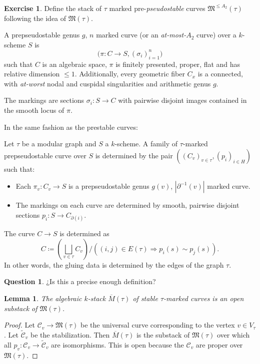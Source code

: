 \documentclass[11pt]{article}
\newcommand{\MM}{\mathfrak{M}}
\newcommand{\cC}{\mathcal{C}}
\newcommand{\del}{\partial}
\newcommand{\ol}{\overline}
\renewcommand{\tilde}{\widetilde}
\theoremstyle{plain}
\newtheorem{lem}[prop]{Lemma}
\theoremstyle{remark}
\newenvironment{pf}{\begin{proof}}{\end{proof}}
\newcommand{\sg}{\sigma}
\newcommand{\defeq}{\coloneqq}
\newcommand{\To}{\Rightarrow}
\theoremstyle{plain}
\theoremstyle{definition}
\newtheorem{Ej}[Th]{Exercise}
\newtheorem*{Qn}{Question}
\theoremstyle{remark}
\begin{document}
\begin{ptcb}
  \begin{Ej}
  Define the stack of \(\tau\) marked pre-\emph{pseudostable} curves \(\MM^{\leq A_2}(\tau)\) following the idea of \(\MM(\tau)\).
  \end{Ej}
  \tcbline
  \begin{Def}
    A prepseudostable genus \(g\), \(n\) marked curve (or an \emph{at-most-}\(A_2\) curve) over a \(k\)-scheme \(S\) is 
    \[
      \bigl(\pi:C\to S, (\sg_i)_{i=1}^n\bigr)
    \]
    such that \(C\) is an algebraic space, \(\pi\) is finitely presented, proper, flat and has relative dimension \(\leq 1\). Additionally, every geometric fiber \(C_x\) is a connected, with \emph{at-worst} nodal and cuspidal singularities and arithmetic genus \(g\).\par
    The markings are sections \(\sg_i:S\to C\) with pairwise disjoint images contained in the smooth locus of \(\pi\).
  \end{Def}
  In the same fashion as the prestable curves:

  \begin{Def}
    Let \(\tau\) be a modular graph and \(S\) a \(k\)-scheme. A family of \(\tau\)-marked prepseudostable curve over \(S\) is determined by the pair \(((C_v)_{v\in \tau},(p_i)_{i\in H})\) such that:
  \begin{itemize}
    \item Each \(\pi_v: C_v\to S\) is a prepseudostable genus \(g(v)\), \(|\del^{-1}(v)|\) marked curve.
    \item The markings on each curve are determined by smooth, pairwise disjoint sections \(p_i:S\to C_{\del(i)}\).
  \end{itemize}
  The curve \(C\to S\) is determined as 
  \[
    C\defeq \left(\bigsqcup_{v\in\tau}C_v\right)/((i,j)\in E(\tau)\To p_i(s)\sim p_j(s)).
  \]
  In other words, the gluing data is determined by the edges of the graph \(\tau\).
  \end{Def}
  
  \begin{Qn}
    ¿Is this a precise enough definition?
  \end{Qn}
\end{ptcb}

\begin{lem}\label{soss}
The algebraic \(k\)-stack \(\ol{M}(\tau)\) of stable \(\tau\)-marked curves
is an open substack of \(\MM(\tau)\).
\end{lem}
\begin{pf}
Let \(\cC_v\rightarrow\MM(\tau)\) be the universal curve
corresponding to the vertex \(v\in V_{\tau}\). Let \(\tilde{\cC}_v\) be
the stabilization. Then \(\ol{M}(\tau)\) is the substack of \(\MM(\tau)\)
over which all \(p_v:\cC_v\to\tilde{\cC}_v\) are isomorphisms. This is
open because the \(\cC_v\) are proper over \(\MM(\tau)\).
\end{pf}
\end{document}
